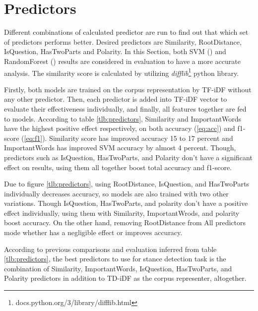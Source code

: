 \section{Predictors}
\label{sec:predictors}
Different combinations of calculated predictor are run to find out that which set of predictors performs better. Desired predictors are Similarity, RootDistance, IsQuestion, HasTwoParts and Polarity. In this Section, both SVM (\cite{svc}) and RandomForest (\cite{randomforest}) results are considered in evaluation to have a more accurate analysis. The similarity score is calculated by utilizing \textit{difflib}\footnote{docs.python.org/3/library/difflib.html} python library.


Firstly, both models are trained on the corpus representation by TF-iDF without any other predictor. Then, each predictor is added into TF-iDF vector to evaluate their effectiveness individually, and finally, all features together are fed to models. According to table \ref{tlb:predictors}, Similarity and ImportantWords have the highest positive effect respectively, on both accuracy (\ref{eq:acc}) and f1-score (\ref{eq:f1}). Similarity score has improved accuracy 15 to 17 percent and ImportantWords has improved SVM accuracy by almost 4 percent. Though, predictors such as IsQuestion, HasTwoParts, and Polarity don't have a significant effect on results, using them all together boost total accuracy and f1-score. 

Due to figure \ref{tlb:predictors}, using RootDistance, IsQuestion, and HasTwoParts individually decreases accuracy, so models are also trained with two other variations. Though IsQuestion, HasTwoParts, and polarity don't have a positive effect individually, using them with Similarity, ImportantWrods, and polarity boost accuracy. On the other hand, removing RootDistance from All predictors mode whether has a negligible effect or improves accuracy. 

According to previous comparisons and evaluation inferred from table \ref{tlb:predictors}, the best predictors to use for stance detection task is the combination of Similarity, ImportantWords, IsQuestion, HasTwoParts, and Polarity predictors in addition to TD-iDF as the corpus representer, altogether.


